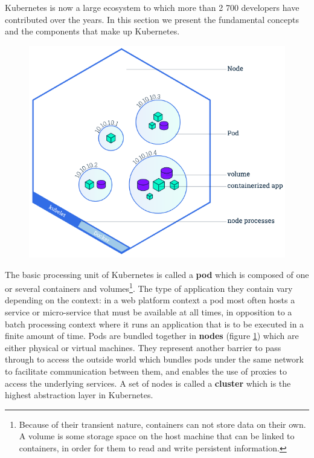 Kubernetes is now a large ecosystem to which more than 2 700 developers have
contributed over the years. In this section we present the fundamental concepts
and the components that make up Kubernetes.

\begin{figure}[h]
	\centering
	\includegraphics[scale=0.5]{./imgs/node-overview.png}
	\label{fig:node-overview}
\end{figure}

The basic processing unit of Kubernetes is called a \textbf{pod} which is
composed of one or several containers and volumes\footnote{Because of their
	transient nature, containers can not store data on their own. A volume
	is some storage space on the host machine that can be linked to
containers, in order for them to read and write persistent information.}. The
type of application they contain vary depending on the context: in a web
platform context a pod most often hosts a service or micro-service that must be
available at all times, in opposition to a batch processing context where it
runs an application that is to be executed in a finite amount of time.  Pods
are bundled together in \textbf{nodes} (figure \ref{fig:node-overview}) which
are either physical or virtual machines. They represent another barrier to pass
through to access the outside world which bundles pods under the same network
to facilitate communication between them, and enables the use of proxies to
access the underlying services. A set of nodes is called a \textbf{cluster}
which is the highest abstraction layer in Kubernetes.

